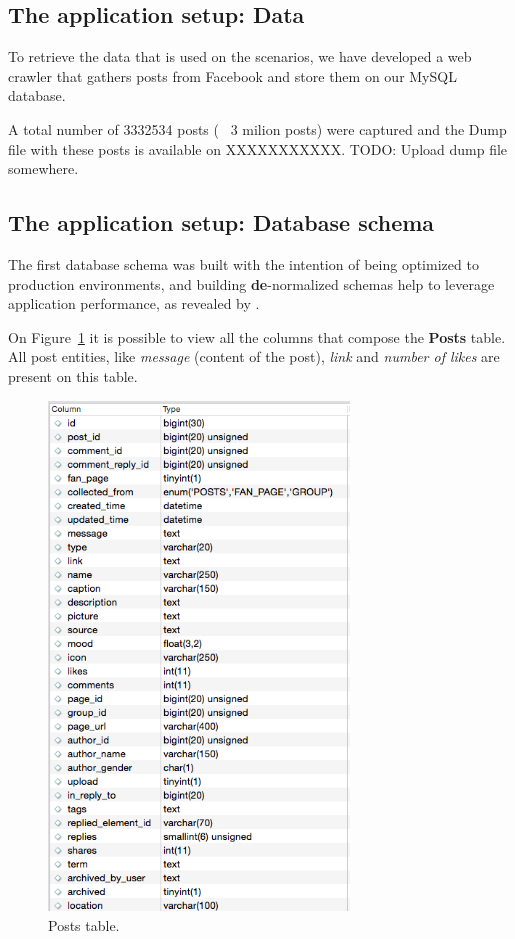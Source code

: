 \subsection{The application setup: Data}
To retrieve the data that is used on the scenarios, we have developed a web crawler that gathers posts from Facebook and store them on our MySQL database. 

A total number of 3332534 posts (~ 3 milion posts) were captured and the Dump file with these posts is available on XXXXXXXXXXX. TODO: Upload dump file somewhere. 

\subsection{The application setup: Database schema}
The first database schema was built with the intention of being optimized to production environments, and building \textbf{de}-normalized schemas help to leverage application performance, as revealed by \cite{926306}. 

On Figure~\ref{fig:postsTable} it is possible to view all the columns that compose the \textbf{Posts} table. All post entities, like \textit{message} (content of the post), \textit{link} and \textit{number of likes} are present on this table. 

\begin{figure}[ht!]
\centering
\includegraphics[width=80mm]{postTable.png}
\caption{Posts table.\label{fig:postsTable}}
\end{figure}

